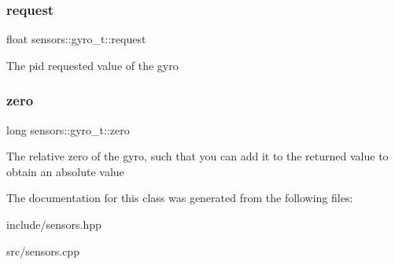 \subsubsection{\texorpdfstring{request}{request}}
{\footnotesize\ttfamily float sensors\+::gyro\+\_\+t\+::request}

The pid requested value of the gyro \mbox{\label{classsensors_1_1gyro__t_ac66c52c31ee9cff57a88b514a9f99051}} 
\subsubsection{\texorpdfstring{zero}{zero}}
{\footnotesize\ttfamily long sensors\+::gyro\+\_\+t\+::zero}

The relative zero of the gyro, such that you can add it to the returned value to obtain an absolute value 

The documentation for this class was generated from the following files\+:\begin{DoxyCompactItemize}
\item 
include/sensors.\+hpp\item 
src/sensors.\+cpp\end{DoxyCompactItemize}
